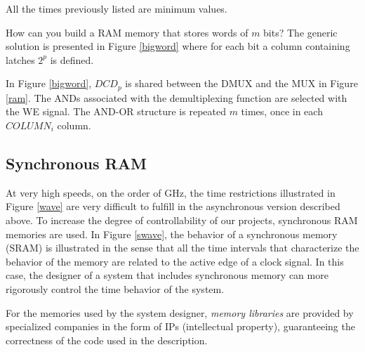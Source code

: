 All the times previously listed are minimum values.

\textcolor[rgb]{0.00,0.00,0.00}{}

How can you build a RAM memory that stores words of $m$ bits? The generic solution is presented in Figure \ref{bigword} where for each bit a column containing latches $2^p$ is defined.

In Figure \ref{bigword}, $DCD_p$ is shared between the DMUX and the MUX in Figure \ref{ram}. The ANDs associated with the demultiplexing function are selected with the WE signal. The AND-OR structure is repeated $m$ times, once in each $COLUMN_i$ column.


\subsection{Synchronous RAM}\label{syncMem}
At very high speeds, on the order of GHz, the time restrictions illustrated in Figure \ref{wave} are very difficult to fulfill in the asynchronous version described above. To increase the degree of controllability of our projects, synchronous RAM memories are used. In Figure \ref{swave}, the behavior of a synchronous memory (SRAM) is illustrated in the sense that all the time intervals that characterize the behavior of the memory are related to the active edge of a clock signal. In this case, the designer of a system that includes synchronous memory can more rigorously control the time behavior of the system.

For the memories used by the system designer, {\em memory libraries} are provided by specialized companies in the form of IPs (intellectual property), guaranteeing the correctness of the code used in the description.


